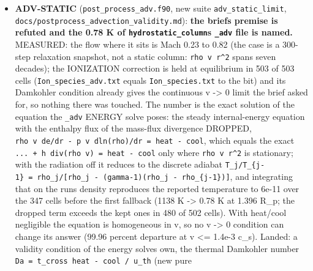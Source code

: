 \documentclass[english,a4paper]{my_memo}
\begin{document}
\begin{itemize}
  their neighbors) and the new run is smooth (1.6e5 to 3.9e5 across cells
  18-26; rho, p, T within 1e-6); \textbf{\texttt{hydrostatic\_column}} reads 0.999 in the
  adv file\textquotesingle s T at cell 350 because the adv post-process gives T\_adv = 0.78 K
  inside 1.40 Rp in this static column (the original T is 1124 K
  throughout) and the edge of that region moved by one cell; the non-adv
  files move by 4.6e-8 (Ion\_species by 0.16 at cell 2 on values of 1e-182,
  denormal noise). The adv defect is recorded as an open item. \textbf{Goldens to
  be refreshed by the user} (archive first), then \texttt{make\ check} re-run.
\item
  \textbf{ADV-STATIC} (\texttt{post\_process\_adv.f90}, new suite \texttt{adv\_static\_limit},
  \texttt{docs/postprocess\_advection\_validity.md}): \textbf{the brief\textquotesingle s premise is
  refuted and the 0.78 K of \texttt{hydrostatic\_column}\textquotesingle s \texttt{\_adv} file is named.}
  MEASURED: the flow where it sits is Mach 0.23 to 0.82 (the case is a
  300-step relaxation snapshot, not a static column: \texttt{rho\ v\ r\^{}2} spans seven
  decades); the IONIZATION correction is held at equilibrium in 503 of 503
  cells (\texttt{Ion\_species\_adv.txt} equals \texttt{Ion\_species.txt} to the bit) and its
  Damkohler condition already gives the continuous v -\textgreater{} 0 limit the brief
  asked for, so nothing there was touched. The number is the exact solution
  of the equation the \texttt{\_adv} ENERGY solve poses: the steady internal-energy
  equation with the enthalpy flux of the mass-flux divergence DROPPED,
  \texttt{rho\ v\ de/dr\ -\ p\ v\ dln(rho)/dr\ =\ heat\ -\ cool}, which equals the exact
  \texttt{...\ +\ h\ div(rho\ v)\ =\ heat\ -\ cool} only where \texttt{rho\ v\ r\^{}2} is stationary;
  with the radiation off it reduces to the discrete adiabat \texttt{T\_j/T\_\{j-1\}\ =\ rho\_j/{[}rho\_j\ -\ (gamma-1)(rho\_j\ -\ rho\_\{j-1\}){]}}, and integrating that on the
  run\textquotesingle s density reproduces the reported temperature to 6e-11 over the 347
  cells before the first fallback (1138 K -\textgreater{} 0.78 K at 1.396 R\_p; the
  dropped term exceeds the kept ones in 480 of 502 cells). With heat/cool
  negligible the equation is homogeneous in v, so no v -\textgreater{} 0 condition can
  change its answer (99.96 percent departure at \textbar v\textbar{} \textless= 1.4e-3 c\_s). Landed:
  a validity condition of the energy solve\textquotesingle s own, the thermal Damkohler
  number \texttt{Da\ =\ t\_cross\ \textbar{}heat\ -\ cool\textbar{}\ /\ u\_th} (new pure

\end{itemize}
\end{document}
